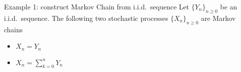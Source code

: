 \documentclass[letterpaper,mathserif,handout]{beamer}
\begin{document}
\begin{frame}{Example 1: construct Markov Chain from i.i.d.~sequence}
Let $\{ Y_n \}_{n \geq 0}$ be an i.i.d.~sequence. The following two stochastic 
processes $\{ X_n \}_{n \geq 0}$ are Markov chains

\begin{itemize}
	\item $X_n = Y_n$
	\item $X_n = \sum_{k = 0}^{n} Y_n$
\end{itemize}
\end{frame}



%
%
%
%
%
%
%
\end{document}
